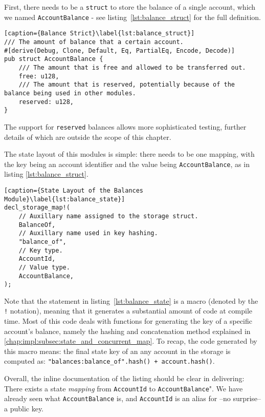 First, there needs to be a \texttt{struct} to store the balance of a single account, which we named
\texttt{AccountBalance} - see listing~\ref{lst:balance_struct} for the full definition.

\begin{lstlisting}[caption={Balance Strict}\label{lst:balance_struct}]
/// The amount of balance that a certain account.
#[derive(Debug, Clone, Default, Eq, PartialEq, Encode, Decode)]
pub struct AccountBalance {
	/// The amount that is free and allowed to be transferred out.
	free: u128,
	/// The amount that is reserved, potentially because of the balance being used in other modules.
	reserved: u128,
}
\end{lstlisting}

\begin{remark}
	The support for \texttt{reserved} balances allows more sophisticated testing, further details of
	which are outside the scope of this chapter.
\end{remark}

The state layout of this modules is simple: there needs to be one mapping, with the key being an
account identifier and the value being \texttt{AccountBalance}, as in listing
\ref{lst:balance_struct}.

\begin{lstlisting}[caption={State Layout of the Balances Module}\label{lst:balance_state}]
decl_storage_map!(
	// Auxillary name assigned to the storage struct.
	BalanceOf,
	// Auxillary name used in key hashing.
	"balance_of",
	// Key type.
	AccountId,
	// Value type.
	AccountBalance,
);
\end{lstlisting}

Note that the statement in listing~\ref{lst:balance_state} is a macro (denoted by the \texttt{!} notation), meaning that it
generates a substantial amount of code at compile time. Most of this code deals with functions for
generating the key of a specific account's balance, namely the hashing and concatenation method
explained in \ref{chap:impl:subsec:state_and_concurrent_map}. To recap, the code generated by this
macro means: the final state key of an any account in the storage is computed as:
\texttt{"balances:balance\_of".hash() + account.hash()}.

Overall, the inline documentation of the listing should be clear in delivering: There exists a state
\textit{mapping} from \texttt{AccountId} to \texttt{AccountBalance}". We have already seen what
\texttt{AccountBalance} is, and \texttt{AccountId} is an alias for --no surprise-- a public key.

